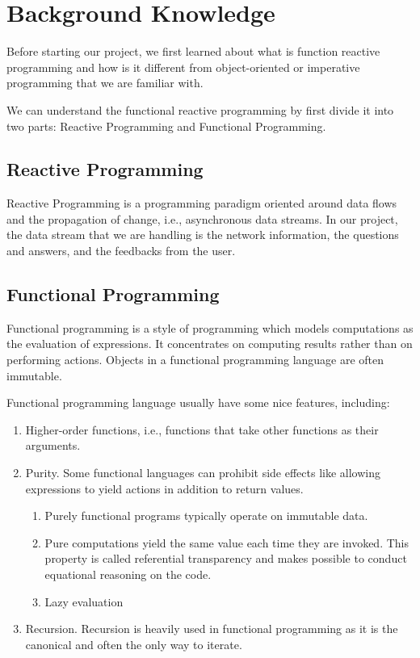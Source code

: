 \section{Background Knowledge}
\label{sec:back}

Before starting our project, we first learned about what is function reactive programming and how is it different from object-oriented or imperative programming that we are familiar with.

We can understand the functional reactive programming by first divide it into two parts: Reactive Programming and Functional Programming.

\subsection{Reactive Programming}

Reactive Programming is a programming paradigm oriented around data flows and the propagation of change, i.e., asynchronous data streams. In our project, the data stream that we are handling is the network information, the questions and answers, and the feedbacks from the user.


\subsection{Functional Programming}

Functional programming is a style of programming which models computations as the evaluation of expressions. It concentrates on computing results rather than on performing actions.  Objects in a functional programming language are often immutable. 

Functional programming language usually have some nice features, including:

\begin{enumerate}
	\item Higher-order functions, i.e.,  functions that take other functions as their arguments. 
	\item Purity. Some functional languages can prohibit side effects like allowing expressions to yield actions in addition to return values. 
	\begin{enumerate}
		\item Purely functional programs typically operate on immutable data.
		\item Pure computations yield the same value each time they are invoked. This property is called referential transparency and makes possible to conduct equational reasoning on the code.
		\item Lazy evaluation
	\end{enumerate}
	\item Recursion. Recursion is heavily used in functional programming as it is the canonical and often the only way to iterate. 
\end{enumerate}


